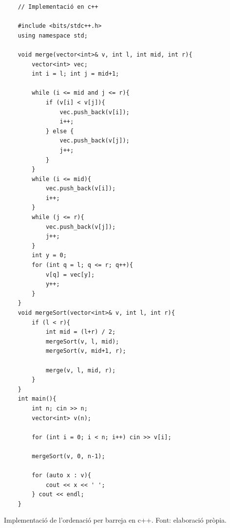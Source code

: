 \begin{longlisting}
    \begin{verbatim}
    // Implementació en c++
    
    #include <bits/stdc++.h>
    using namespace std;
    
    void merge(vector<int>& v, int l, int mid, int r){
        vector<int> vec;
        int i = l; int j = mid+1;
    
        while (i <= mid and j <= r){
            if (v[i] < v[j]){
                vec.push_back(v[i]);
                i++;
            } else {
                vec.push_back(v[j]);
                j++;
            }
        }
        while (i <= mid){
            vec.push_back(v[i]);
            i++;
        }
        while (j <= r){
            vec.push_back(v[j]);
            j++;
        }   
        int y = 0;
        for (int q = l; q <= r; q++){
            v[q] = vec[y];
            y++; 
        }
    }
    void mergeSort(vector<int>& v, int l, int r){
        if (l < r){
            int mid = (l+r) / 2;
            mergeSort(v, l, mid);
            mergeSort(v, mid+1, r);
    
            merge(v, l, mid, r);
        }
    }
    int main(){
        int n; cin >> n;
        vector<int> v(n);
        
        for (int i = 0; i < n; i++) cin >> v[i];
    
        mergeSort(v, 0, n-1);
    
        for (auto x : v){
            cout << x << ' ';
        } cout << endl;
    }
    \end{verbatim}
    \caption[Implementació de l'ordenació per barreja en c++.]{Implementació de l'ordenació per barreja en c++. Font: elaboració pròpia.}
    \label{Figura}
\end{longlisting}
